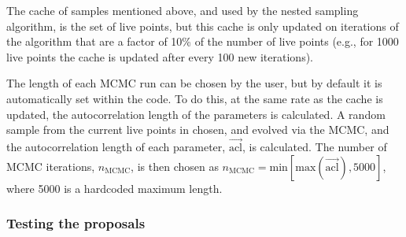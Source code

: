The cache of samples mentioned above, and used by the nested sampling algorithm, is the set of live points, but this cache is
only updated on iterations of the algorithm that are a factor of 10\% of the number of live points (e.g., for 1000 live points
the cache is updated after every 100 new iterations).

The length of each MCMC run can be chosen by the user, but by default it is automatically set within the code. To do this,
at the same rate as the cache is updated, the autocorrelation length of the parameters is calculated. A random sample from the current
live points in chosen, and evolved via the MCMC, and the autocorrelation length of each parameter, $\vec{{\text{acl}}}$, is calculated. The number
of MCMC iterations, $n_{\text{MCMC}}$, is then chosen as $n_{\text{MCMC}} = \text{min}[\text{max}(\vec{\text{acl}}), 5000]$, where 5000 is
a hardcoded maximum length.

\subsubsection{Testing the proposals}\label{sec:proposaltesting}

